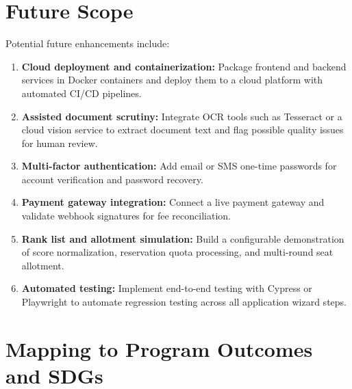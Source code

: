 \documentclass[12pt,a4paper,oneside]{report}
\begin{document}
\chapter{Future Scope}

Potential future enhancements include:
\begin{enumerate}
    \item \textbf{Cloud deployment and containerization:} Package frontend and backend services in Docker containers and deploy them to a cloud platform with automated CI/CD pipelines.
    \item \textbf{Assisted document scrutiny:} Integrate OCR tools such as Tesseract or a cloud vision service to extract document text and flag possible quality issues for human review.
    \item \textbf{Multi-factor authentication:} Add email or SMS one-time passwords for account verification and password recovery.
    \item \textbf{Payment gateway integration:} Connect a live payment gateway and validate webhook signatures for fee reconciliation.
    \item \textbf{Rank list and allotment simulation:} Build a configurable demonstration of score normalization, reservation quota processing, and multi-round seat allotment.
    \item \textbf{Automated testing:} Implement end-to-end testing with Cypress or Playwright to automate regression testing across all application wizard steps.
\end{enumerate}

\chapter{Mapping to Program Outcomes and SDGs}
\end{document}
